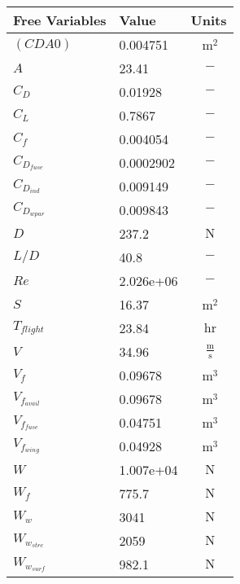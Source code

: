 % 

{\footnotesize
\begin{longtable}{llc}
\toprule
Free Variables & Value & Units \\ \midrule
$(CDA0)$ & 0.004751  & $~\mathrm{m^{2}}$ \\
$A$ & 23.41  & $~\mathrm{-}$ \\
$C_D$ & 0.01928  & $~\mathrm{-}$ \\
$C_L$ & 0.7867  & $~\mathrm{-}$ \\
$C_f$ & 0.004054  & $~\mathrm{-}$ \\
$C_{D_{fuse}}$ & 0.0002902  & $~\mathrm{-}$ \\
$C_{D_{ind}}$ & 0.009149  & $~\mathrm{-}$ \\
$C_{D_{wpar}}$ & 0.009843  & $~\mathrm{-}$ \\
$D$ & 237.2  & $~\mathrm{N}$ \\
$L/D$ & 40.8  & $~\mathrm{-}$ \\
$Re$ & 2.026e+06  & $~\mathrm{-}$ \\
$S$ & 16.37  & $~\mathrm{m^{2}}$ \\
$T_{flight}$ & 23.84  & $~\mathrm{hr}$ \\
$V$ & 34.96  & $~\mathrm{\tfrac{m}{s}}$ \\
$V_f$ & 0.09678  & $~\mathrm{m^{3}}$ \\
$V_{f_{avail}}$ & 0.09678  & $~\mathrm{m^{3}}$ \\
$V_{f_{fuse}}$ & 0.04751  & $~\mathrm{m^{3}}$ \\
$V_{f_{wing}}$ & 0.04928  & $~\mathrm{m^{3}}$ \\
$W$ & 1.007e+04  & $~\mathrm{N}$ \\
$W_f$ & 775.7  & $~\mathrm{N}$ \\
$W_w$ & 3041  & $~\mathrm{N}$ \\
$W_{w_{strc}}$ & 2059  & $~\mathrm{N}$ \\
$W_{w_{surf}}$ & 982.1  & $~\mathrm{N}$ \\
\bottomrule
\end{longtable}}


